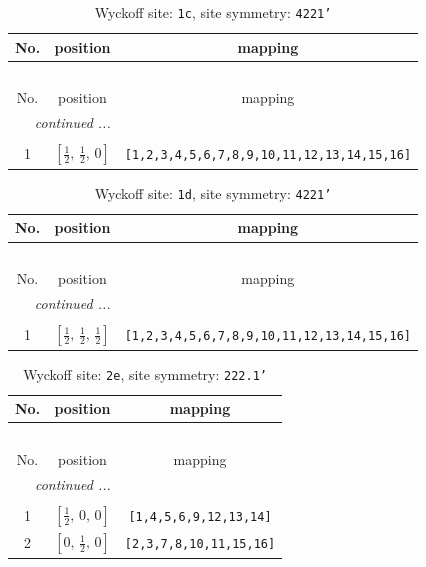 \documentclass[fleqn,8pt]{jsarticle}
\begin{document}
\begin{longtable}{ccc}
\caption{Wyckoff site: {\tt 1c}, site symmetry: {\tt 4221'}}
 \\
 \hline \hline
No. & position & mapping \\ \hline \endfirsthead

\multicolumn{2}{l}{\tablename\ \thetable{}} \\
 \hline \hline
No. & position & mapping \\ \hline \endhead

 \hline \hline
\multicolumn{2}{r}{\footnotesize\it continued ...} \\ \endfoot

 \hline \hline
\multicolumn{2}{r}{} \\ \endlastfoot

1 & $\left[ \frac{1}{2},\, \frac{1}{2},\, 0 \right]$ & {\tt [1,2,3,4,5,6,7,8,9,10,11,12,13,14,15,16]} \\
\end{longtable}
\renewcommand{\arraystretch}{1.2}
\begin{longtable}{ccc}
\caption{Wyckoff site: {\tt 1d}, site symmetry: {\tt 4221'}}
 \\
 \hline \hline
No. & position & mapping \\ \hline \endfirsthead

\multicolumn{2}{l}{\tablename\ \thetable{}} \\
 \hline \hline
No. & position & mapping \\ \hline \endhead

 \hline \hline
\multicolumn{2}{r}{\footnotesize\it continued ...} \\ \endfoot

 \hline \hline
\multicolumn{2}{r}{} \\ \endlastfoot

1 & $\left[ \frac{1}{2},\, \frac{1}{2},\, \frac{1}{2} \right]$ & {\tt [1,2,3,4,5,6,7,8,9,10,11,12,13,14,15,16]} \\
\end{longtable}
\renewcommand{\arraystretch}{1.2}
\begin{longtable}{ccc}
\caption{Wyckoff site: {\tt 2e}, site symmetry: {\tt 222.1'}}
 \\
 \hline \hline
No. & position & mapping \\ \hline \endfirsthead

\multicolumn{2}{l}{\tablename\ \thetable{}} \\
 \hline \hline
No. & position & mapping \\ \hline \endhead

 \hline \hline
\multicolumn{2}{r}{\footnotesize\it continued ...} \\ \endfoot

 \hline \hline
\multicolumn{2}{r}{} \\ \endlastfoot

1 & $\left[ \frac{1}{2},\, 0,\, 0 \right]$ & {\tt [1,4,5,6,9,12,13,14]} \\ \hline
2 & $\left[ 0,\, \frac{1}{2},\, 0 \right]$ & {\tt [2,3,7,8,10,11,15,16]} \\
\end{longtable}
\end{document}
